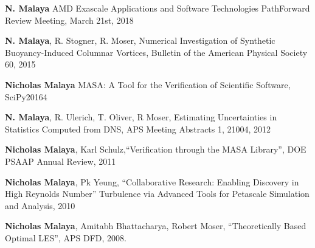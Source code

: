 \textbf{N. Malaya}
AMD Exascale Applications and Software Technologies
PathForward Review Meeting, March 21st, 2018

\blankline

\textbf{N. Malaya}, R. Stogner, R. Moser,
Numerical Investigation of Synthetic Buoyancy-Induced Columnar Vortices,
Bulletin of the American Physical Society 60, 2015

\blankline

\textbf{Nicholas Malaya}
MASA: A Tool for the Verification of Scientific Software, SciPy20164
\blankline

\textbf{N. Malaya}, R. Ulerich, T. Oliver, R Moser, Estimating Uncertainties in
Statistics Computed from DNS, APS Meeting Abstracts 1, 21004, 2012 

\blankline

\textbf{Nicholas Malaya}, Karl Schulz,``Verification through the MASA Library'', DOE
PSAAP Annual Review, 2011

\blankline

\textbf{Nicholas Malaya},  Pk Yeung, ``Collaborative Research: Enabling Discovery in High Reynolds Number''
Turbulence via Advanced Tools for Petascale Simulation and Analysis, 2010

\blankline

\textbf{Nicholas Malaya}, Amitabh Bhattacharya, Robert Moser,
``Theoretically Based Optimal LES'', APS DFD, 2008.
